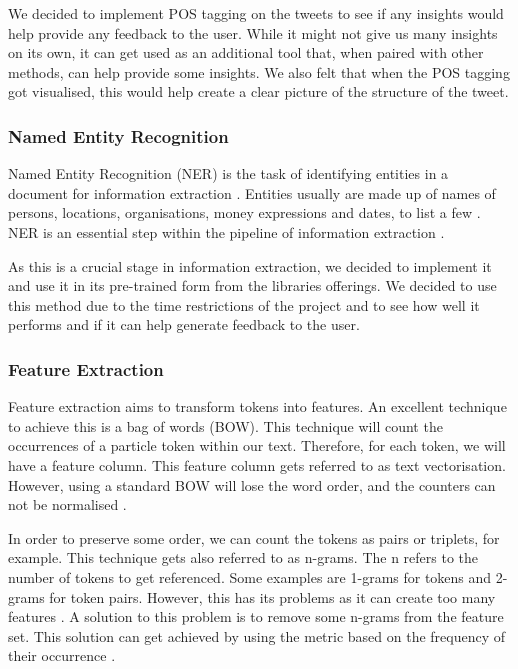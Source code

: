 	We decided to implement POS tagging on the tweets to see if any insights would help provide any feedback to the user. While it might not give us many insights on its own, it can get used as an additional tool that, when paired with other methods, can help provide some insights. We also felt that when the POS tagging got visualised, this would help create a clear picture of the structure of the tweet.
	
	
	\subsubsection{Named Entity Recognition}
	Named Entity Recognition (NER) is the task of identifying entities in a document for information extraction \cite{vajjala2020practical}. Entities usually are made up of names of persons, locations, organisations, money expressions and dates, to list a few \cite{hapke2019natural}. NER is an essential step within the pipeline of information extraction \cite{vajjala2020practical}.
	
	As this is a crucial stage in information extraction, we decided to implement it and use it in its pre-trained form from the libraries offerings. We decided to use this method due to the time restrictions of the project and to see how well it performs and if it can help generate feedback to the user.
	
	
	\subsubsection{Feature Extraction}
	Feature extraction aims to transform tokens into features. An excellent technique to achieve this is a bag of words (BOW). This technique will count the occurrences of a particle token within our text. Therefore, for each token, we will have a feature column. This feature column gets referred to as text vectorisation. However, using a standard BOW will lose the word order, and the counters can not be normalised \cite{hapke2019natural}. 
	
	In order to preserve some order, we can count the tokens as pairs or triplets, for example. This technique gets also referred to as n-grams. The n refers to the number of tokens to get referenced. Some examples are 1-grams for tokens and 2-grams for token pairs. However, this has its problems as it can create too many features \cite{vajjala2020practical}. A solution to this problem is to remove some n-grams from the feature set. This solution can get achieved by using the metric based on the frequency of their occurrence \cite{vajjala2020practical}.
	
